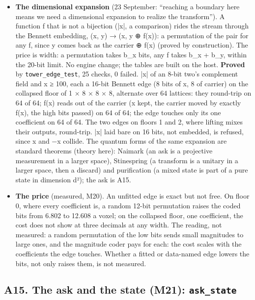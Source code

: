 \begin{itemize}
\item \textbf{The dimensional expansion} (23 September: “reaching a boundary here means we need a dimensional expansion to realize the transform”). A function f that is not a bijection (|x|, a comparison) rides the stream through the Bennett embedding, (x, y) → (x, y ⊕ f(x)): a permutation of the pair for any f, since y comes back as the carrier ⊕ f(x) (proved by construction). The price is width: a permutation takes b\_\allowbreak{}x bits, any f takes b\_\allowbreak{}x + b\_\allowbreak{}y, within the 20-bit limit. No engine change; the tables are built on the host. \textbf{Proved} by \texttt{tower\_\allowbreak{}edge\_\allowbreak{}test}, 25 checks, 0 failed. |x| of an 8-bit two's complement field and x ≥ 100, each a 16-bit Bennett edge (8 bits of x, 8 of carrier) on the collapsed floor of 1 × 8 × 8 × 8, alternate over 64 lattices: they round-trip on 64 of 64; f(x) reads out of the carrier (x kept, the carrier moved by exactly f(x), the high bits passed) on 64 of 64; the edge touches only its one coefficient on 64 of 64. The two edges on floors 1 and 2, where lifting mixes their outputs, round-trip. |x| laid bare on 16 bits, not embedded, is refused, since x and −x collide. The quantum forms of the same expansion are standard theorems (theory here): Naimark (an ask is a projective measurement in a larger space), Stinespring (a transform is a unitary in a larger space, then a discard) and purification (a mixed state is part of a pure state in dimension d²); the ask is A15.
\item \textbf{The price} (measured, M20). An unfitted edge is exact but not free. On floor 0, where every coefficient is, a random 12-bit permutation raises the coded bits from 6.802 to 12.608 a voxel; on the collapsed floor, one coefficient, the cost does not show at three decimals at any width. The reading, not measured: a random permutation of the low bits sends small magnitudes to large ones, and the magnitude coder pays for each: the cost scales with the coefficients the edge touches. Whether a fitted or data-named edge lowers the bits, not only raises them, is not measured.
\end{itemize}

\subsection{\texorpdfstring{A15. The ask and the state (M21): \texttt{ask\_\allowbreak{}state}}{A15. The ask and the state (M21): ask\_state}}

